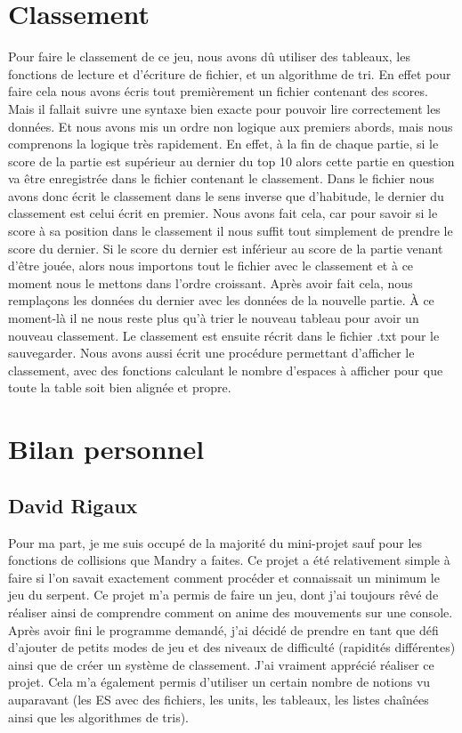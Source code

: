 \documentclass[12pt]{article}
\begin{document}
\section{Classement}
Pour faire le classement de ce jeu, nous avons dû utiliser des tableaux, les fonctions de lecture et d'écriture de fichier, et un algorithme de tri. En effet pour faire cela nous avons écris tout premièrement un fichier contenant des scores. Mais il fallait suivre une syntaxe bien exacte pour pouvoir lire correctement les données. Et nous avons mis un ordre non logique aux premiers abords, mais nous comprenons la logique très rapidement. En effet, à la fin de chaque partie, si le score de la partie est supérieur au dernier du top 10 alors cette partie en question va être enregistrée dans le fichier contenant le classement. Dans le fichier nous avons donc écrit le classement dans le sens inverse que d'habitude, le dernier du classement est celui écrit en premier. Nous avons fait cela, car pour savoir si le score à sa position dans le classement il nous suffit tout simplement de prendre le score du dernier. Si le score du dernier est inférieur au score de la partie venant d'être jouée, alors nous importons tout le fichier avec le classement et à ce moment nous le mettons dans l'ordre croissant. Après avoir fait cela, nous remplaçons les données du dernier avec les données de la nouvelle partie.
À ce moment-là il ne nous reste plus qu'à trier le nouveau tableau pour avoir un nouveau classement. Le classement est ensuite récrit dans le fichier .txt pour le sauvegarder.
Nous avons aussi écrit une procédure permettant d'afficher le classement, avec des fonctions calculant le nombre d'espaces à afficher pour que toute la table soit bien alignée et propre.
\section{Bilan personnel}
\subsection{David Rigaux}
Pour ma part, je me suis occupé de la majorité du mini-projet sauf pour les fonctions de collisions que Mandry a faites.
Ce projet a été relativement simple à faire si l'on savait exactement comment procéder et connaissait un minimum le jeu du serpent. Ce projet m'a permis de faire un jeu, dont j'ai toujours rêvé de réaliser ainsi de comprendre comment on anime des mouvements sur une console. Après avoir fini le programme demandé, j'ai décidé de prendre en tant que défi d'ajouter de petits modes de jeu et des niveaux de difficulté (rapidités différentes) ainsi que de créer un système de classement. J'ai vraiment apprécié réaliser ce projet. Cela m'a également permis d'utiliser un certain nombre de notions vu auparavant (les ES avec des fichiers, les units, les tableaux, les listes chaînées ainsi que les algorithmes de tris).
\end{document}

